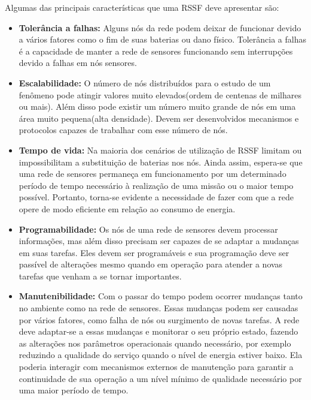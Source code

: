 Algumas das principais características que uma RSSF deve apresentar são:
 \begin{itemize}
 \item \textbf{Tolerância a falhas:} Alguns nós da rede podem deixar de funcionar devido a vários fatores como o fim de suas baterias ou dano físico. Tolerância a falhas é a capacidade de manter a rede de sensores funcionando sem interrupções devido a falhas em nós sensores\cite{Srisathapornphat2001,Hoblos2000}.
 \item \textbf{Escalabilidade:} O número de nós distribuídos para o estudo de um fenômeno pode atingir valores muito elevados(ordem de centenas de milhares ou mais). Além disso pode existir um número muito grande de nós em uma área muito pequena(alta densidade). Devem ser desenvolvidos mecanismos e protocolos capazes de trabalhar com esse número de nós.
 \item \textbf{Tempo de vida:} Na maioria dos cenários de utilização de RSSF limitam ou impossibilitam a substituição de baterias nos nós\cite{Karl2005}. Ainda assim, espera-se que uma rede de sensores permaneça em funcionamento por um determinado período de tempo necessário à realização de uma missão ou o maior tempo possível. Portanto, torna-se evidente a necessidade de fazer com que a rede opere de modo eficiente em relação ao consumo de energia.
 \item \textbf{Programabilidade:} Os nós de uma rede de sensores devem processar informações, mas além disso precisam ser capazes de se adaptar a mudanças em suas tarefas. Eles devem ser programáveis e sua programação deve ser passível de alterações mesmo quando em operação para atender a novas tarefas que venham a se tornar importantes\cite{Karl2005}.
 \item \textbf{Manutenibilidade:} Com o passar do tempo podem ocorrer mudanças tanto no ambiente como na rede de sensores. Essas mudanças podem ser causadas por vários fatores, como falha de nós ou surgimento de novas tarefas. A rede deve adaptar-se a essas mudanças e monitorar o seu próprio estado, fazendo as alterações nos parâmetros operacionais quando necessário, por exemplo reduzindo a qualidade do serviço quando o nível de energia estiver baixo. Ela poderia interagir com mecanismos externos de manutenção para garantir a continuidade de sua operação a um nível mínimo de qualidade necessário por uma maior período de tempo\cite{Mainwaring2002}.
 \end{itemize}

